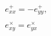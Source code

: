 \begin{equation}
\begin{array}{c}
e_{xx}^{+}=-e_{yy}^{+}, \\ 
\\ 
e_{xy}^{\times }=e_{yx}^{\times }
\end{array}
\label{34}
\end{equation}

